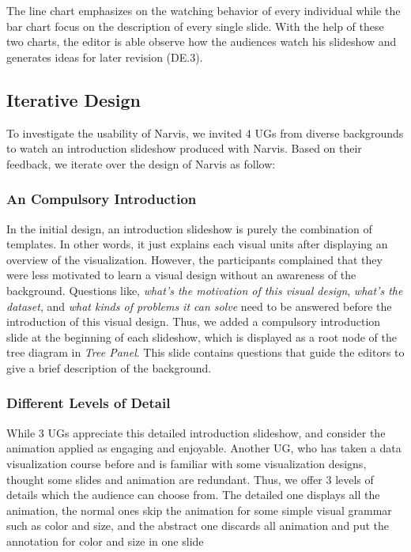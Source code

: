 The line chart emphasizes on the watching behavior of every individual while the bar chart focus on the description of every single slide.  With the help of these two charts, the editor is able observe how the audiences watch his slideshow and generates ideas for later revision (DE.3). 

\subsection{Iterative Design}
To investigate the usability of Narvis, we invited 4 UGs from diverse backgrounds to watch an introduction slideshow produced with Narvis. 
Based on their feedback, we iterate over the design of Narvis as follow:

\subsubsection{An Compulsory Introduction}
In the initial design, an introduction slideshow is purely the combination of templates. In other words, it just explains each visual units after displaying an overview of the visualization. However, the participants complained that they were less motivated to learn a visual design without an awareness of the background. Questions like, \textit{what's the motivation of this visual design}, \textit{what's the dataset}, and \textit{what kinds of problems it can solve} need to be answered before the introduction of this visual design. Thus, we added a compulsory introduction slide at the beginning of each slideshow, which is displayed as a root node of the tree diagram in \textit{Tree Panel}. This slide contains questions that guide the editors to give a brief description of the background.
\subsubsection{Different Levels of Detail}
While 3 UGs appreciate this detailed introduction slideshow, and consider the animation applied as engaging and enjoyable. Another UG, who has taken a data visualization course before and is familiar with some visualization designs, thought some slides and animation are redundant. 
Thus, we offer 3 levels of details which the audience can choose from. The detailed one displays all the animation, the normal ones skip the animation for some simple visual grammar such as color and size, and the abstract one discards all animation and put the annotation for color and size in one slide
 
